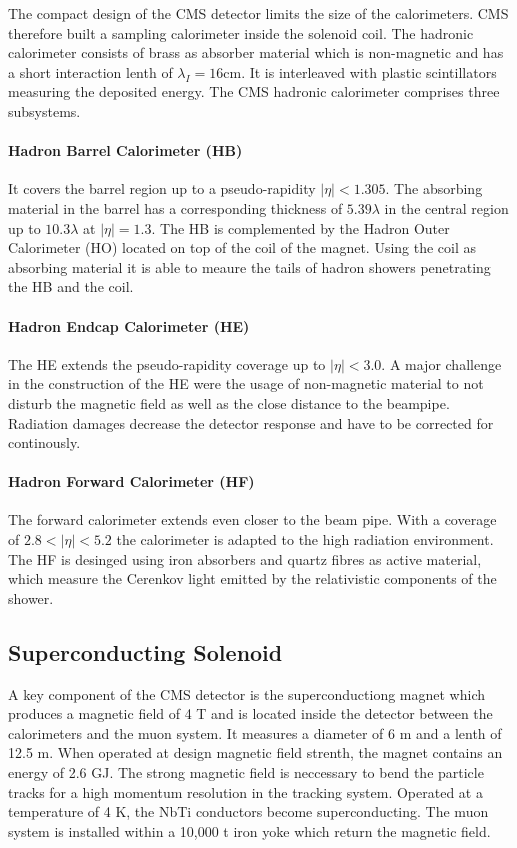 The compact design of the CMS detector limits the size of the calorimeters. CMS
therefore built a sampling calorimeter inside the solenoid coil. The hadronic
calorimeter consists of brass as absorber material which is non-magnetic and
has a short interaction lenth of $\lambda_I = 16 \si{\centi\metre}$. It is
interleaved with plastic scintillators measuring the deposited energy. The CMS
hadronic calorimeter comprises three subsystems. 
\paragraph{Hadron Barrel Calorimeter (HB)}
It covers the barrel region up to a pseudo-rapidity $|\eta| <
1.305$. The absorbing material in the barrel has a corresponding thickness of
$5.39 \lambda$ in the central region up to $10.3 \lambda$ at $|\eta| = 1.3$. The
HB is complemented by the Hadron Outer Calorimeter (HO) located on top
of the coil of the magnet. Using the coil as absorbing material it is able to
meaure the tails of hadron showers penetrating the HB and the coil.

\paragraph{Hadron Endcap Calorimeter (HE)} The HE extends the pseudo-rapidity
coverage up to $|\eta| < 3.0$. A major challenge in the construction of the HE
were the usage of non-magnetic material to not disturb the magnetic field as
well as the close distance to the beampipe. Radiation damages decrease the
detector response and have to be corrected for continously. 

\paragraph{Hadron Forward Calorimeter (HF)} 
The forward calorimeter extends even closer to the beam pipe. With a coverage of
$2.8 < |\eta| < 5.2$ the calorimeter is adapted to the high radiation
environment. The HF is desinged using iron absorbers and quartz fibres as active
material, which measure the Cerenkov light emitted by the relativistic
components of the shower.

\subsection{Superconducting Solenoid}

A key component of the CMS detector is the superconductiong magnet which
produces a magnetic field of 4 T and is located inside the detector between the
calorimeters and the muon system. It measures a diameter of 6 m and a lenth of
12.5 m. When operated at design magnetic field strenth, the magnet contains an
energy of 2.6 GJ. The strong magnetic field is neccessary to bend the particle
tracks for a high momentum resolution in the tracking system. Operated at a
temperature of 4 K, the NbTi conductors become superconducting. The muon system
is installed within a 10,000 t iron yoke which return the magnetic field.

